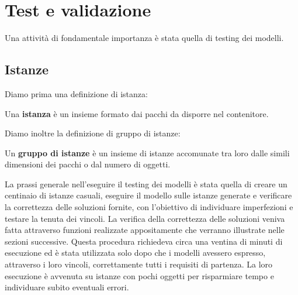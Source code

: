 
\hypertarget{(chap:capitolo5)}{}
\chapter{Test e validazione}
Una attività di fondamentale importanza è stata quella di testing dei modelli.
\section{Istanze}
Diamo prima una definizione di istanza:
\begin{center}
	Una \textbf{istanza} è un insieme formato dai pacchi da disporre nel contenitore.
\end{center}
Diamo inoltre la definizione di gruppo di istanze:
\begin{center}
	Un \textbf{gruppo di istanze} è un insieme di istanze accomunate tra loro dalle simili dimensioni dei pacchi o dal numero di oggetti.
\end{center}
La prassi generale nell'eseguire il testing dei modelli è stata quella di creare un centinaio di istanze casuali, eseguire il modello sulle istanze generate e verificare la correttezza delle soluzioni fornite, con l'obiettivo di individuare imperfezioni e testare la tenuta dei vincoli.
La verifica della correttezza delle soluzioni veniva fatta attraverso funzioni realizzate appositamente che verranno illustrate nelle sezioni successive.
Questa procedura richiedeva circa una ventina di minuti di esecuzione ed è stata utilizzata solo dopo che i modelli avessero espresso, attraverso i loro vincoli, correttamente tutti i requisiti di partenza. La loro esecuzione è avvenuta su istanze con pochi oggetti per risparmiare tempo e individuare subito eventuali errori.

